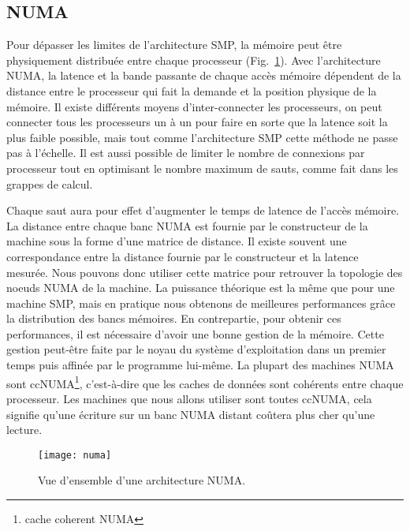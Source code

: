 \subsection{NUMA}
Pour dépasser les limites de l'architecture SMP, la mémoire peut être physiquement distribuée entre chaque processeur (Fig.~\ref{fig:numa}).
%
Avec l'architecture NUMA, la latence et la bande passante de chaque accès mémoire dépendent de la distance entre le processeur qui fait la demande et la position physique de la mémoire.
%
Il existe différents moyens d'inter-connecter les processeurs, on peut connecter tous les processeurs un à un pour faire en sorte que la latence soit la plus faible possible, mais tout comme l'architecture SMP cette méthode ne passe pas à l'échelle.
%
Il est aussi possible de limiter le nombre de connexions par processeur tout en optimisant le nombre maximum de sauts, comme fait dans les grappes de calcul.



Chaque saut aura pour effet d'augmenter le temps de latence de l'accès mémoire.
%
La distance entre chaque banc NUMA est fournie par le constructeur de la machine sous la forme d'une matrice de distance.
%
Il existe souvent une correspondance entre la distance fournie par le constructeur et la latence mesurée.
%
Nous pouvons donc utiliser cette matrice pour retrouver la topologie des noeuds NUMA de la machine.
%
La puissance théorique est la même que pour une machine SMP, mais en pratique nous obtenons de meilleures performances grâce la distribution des bancs mémoires.
%
En contrepartie, pour obtenir ces performances, il est nécessaire d'avoir une bonne gestion de la mémoire.
%
Cette gestion peut-être faite par le noyau du système d'exploitation dans un premier temps puis affinée par le programme lui-même.
%
La plupart des machines NUMA sont ccNUMA\footnote{cache coherent NUMA}, c'est-à-dire que les caches de données sont cohérents entre chaque processeur.
%
Les machines que nous allons utiliser sont toutes ccNUMA, cela signifie qu'une écriture sur un banc NUMA distant coûtera plus cher qu'une lecture.

\begin{figure}[!h]
  \centering
  \texttt{[image: numa]}
  \caption{Vue d'ensemble d'une architecture NUMA.}
  \label{fig:numa}
\end{figure}

